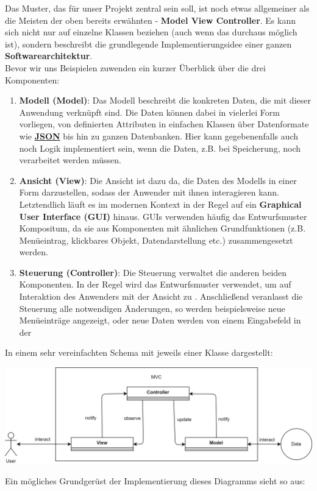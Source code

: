 \documentclass{article}
\begin{document}
Das Muster, das für unser Projekt zentral sein soll, ist noch etwas allgemeiner als die Meisten der oben bereits erwähnten - \textbf{Model View Controller}. Es kann sich nicht nur auf einzelne Klassen beziehen (auch wenn das durchaus möglich ist), sondern beschreibt die grundlegende Implementierungsidee einer ganzen \textbf{Softwarearchitektur}. \\
Bevor wir uns Beispielen zuwenden ein kurzer Überblick über die drei Komponenten:
\begin{enumerate}
    \item \textbf{Modell (Model)}: Das Modell beschreibt die konkreten Daten, die mit dieser Anwendung verknüpft sind. Die Daten können dabei in vielerlei Form vorliegen, von definierten Attributen in einfachen Klassen über Datenformate wie \textbf{\href{https://de.wikipedia.org/wiki/JavaScript_Object_Notation}{JSON}} bis hin zu ganzen Datenbanken. Hier kann gegebenenfalls auch noch Logik implementiert sein, wenn die Daten, z.B. bei Speicherung, noch verarbeitet werden müssen.
    \item \textbf{Ansicht (View)}: Die Ansicht ist dazu da, die Daten des Modells in einer Form darzustellen, sodass der Anwender mit ihnen interagieren kann. Letztendlich läuft es im modernen Kontext in der Regel auf ein \textbf{Graphical User Interface (GUI)} hinaus. GUIs verwenden häufig das Entwurfsmuster Kompositum, da sie aus Komponenten mit ähnlichen Grundfunktionen (z.B. Menüeintrag, klickbares Objekt, Datendarstellung etc.) zusammengesetzt werden. 
    \item \textbf{Steuerung (Controller)}: Die Steuerung verwaltet die anderen beiden Komponenten. In der Regel wird das Entwurfsmuster  verwendet, um auf Interaktion des Anwenders mit der Ansicht zu . Anschließend veranlasst die Steuerung alle notwendigen Änderungen, so werden beispielsweise neue Menüeinträge angezeigt, oder neue Daten werden von einem Eingabefeld in der 
\end{enumerate}

In einem sehr vereinfachten Schema mit jeweils einer Klasse dargestellt:
\begin{center}
    \includegraphics[scale=0.2]{../media/mvc.png}
\end{center}
Ein mögliches Grundgerüst der Implementierung dieses Diagramms sieht so aus: 
\end{document}
